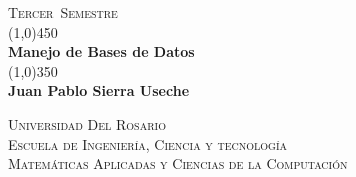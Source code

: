 \documentclass[a4paper]{book}
\newcommand{\titPag}{
    \begin{titlepage}
        \begin{flushright}
            \textsc{\large {\semestre\ Semestre}}\\
            \line(1,0){450} \\
            [0.635cm]
            \huge{\bfseries \asignatura} \\
            [0.2cm]
            \line(1,0){350} \\
            \LARGE{\bfseries \autor} \\
            [16.25cm]
        \end{flushright}
        \begin{flushright}
        \textsc{
            \universidad \\
            [0.1cm]
            \escuela \\
            [0.1cm]
            \carrera
        }
        \end{flushright}
    \end{titlepage}
}
\newcommand{\asignatura}{Manejo de Bases de Datos}
\newcommand{\autor}{Juan Pablo Sierra Useche}
\newcommand{\semestre}{Tercer}
\newcommand{\universidad}{Universidad Del Rosario}
\newcommand{\escuela}{Escuela de Ingeniería, Ciencia y tecnología}
\newcommand{\carrera}{Matemáticas Aplicadas y Ciencias de la Computación}
\begin{document}
    \titPag
    \tableofcontents







    \printbibliography
\end{document}
